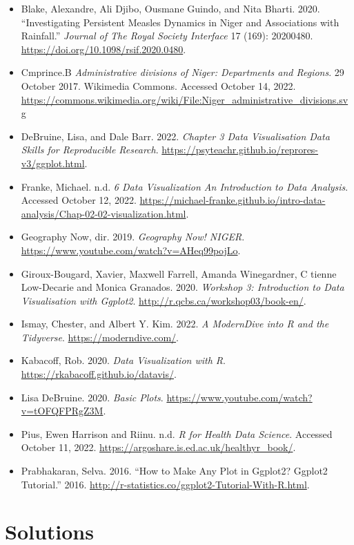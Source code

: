 \documentclass[
  letterpaper,
  DIV=11,
  numbers=noendperiod]{scrreprt}
\begin{document}
\begin{itemize}
\item
  Blake, Alexandre, Ali Djibo, Ousmane Guindo, and Nita Bharti. 2020.
  ``Investigating Persistent Measles Dynamics in Niger and Associations
  with Rainfall.'' \emph{Journal of The Royal Society Interface} 17
  (169): 20200480. \url{https://doi.org/10.1098/rsif.2020.0480}.
\item
  Cmprince.B \emph{Administrative divisions of Niger: Departments and
  Regions}. 29 October 2017. Wikimedia Commons. Accessed October 14,
  2022.
  \url{https://commons.wikimedia.org/wiki/File:Niger_administrative_divisions.svg}
\item
  DeBruine, Lisa, and Dale Barr. 2022. \emph{Chapter 3 Data
  Visualisation \textbar{} Data Skills for Reproducible Research}.
  \url{https://psyteachr.github.io/reprores-v3/ggplot.html}.
\item
  Franke, Michael. n.d. \emph{6 Data Visualization \textbar{} An
  Introduction to Data Analysis}. Accessed October 12, 2022.
  \url{https://michael-franke.github.io/intro-data-analysis/Chap-02-02-visualization.html}.
\item
  Geography Now, dir. 2019. \emph{Geography Now! NIGER}.
  \url{https://www.youtube.com/watch?v=AHeq99pojLo}.
\item
  Giroux-Bougard, Xavier, Maxwell Farrell, Amanda Winegardner, C tienne
  Low-Decarie and Monica Granados. 2020. \emph{Workshop 3: Introduction
  to Data Visualisation with Ggplot2}.
  \url{http://r.qcbs.ca/workshop03/book-en/}.
\item
  Ismay, Chester, and Albert Y. Kim. 2022. \emph{A ModernDive into R and
  the Tidyverse}. \url{https://moderndive.com/}.
\item
  Kabacoff, Rob. 2020. \emph{Data Visualization with R}.
  \url{https://rkabacoff.github.io/datavis/}.
\item
  Lisa DeBruine. 2020. \emph{Basic Plots}.
  \url{https://www.youtube.com/watch?v=tOFQFPRgZ3M}.
\item
  Pius, Ewen Harrison and Riinu. n.d. \emph{R for Health Data Science}.
  Accessed October 11, 2022.
  \url{https://argoshare.is.ed.ac.uk/healthyr_book/}.
\item
  Prabhakaran, Selva. 2016. ``How to Make Any Plot in Ggplot2?
  \textbar{} Ggplot2 Tutorial.'' 2016.
  \url{http://r-statistics.co/ggplot2-Tutorial-With-R.html}.
\end{itemize}

\section{Solutions}\label{solutions-9}
\end{document}

